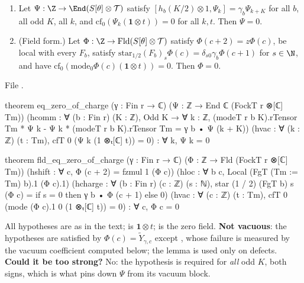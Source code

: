 \begin{theorem}\label{ch08:thm:unique}
\begin{enumerate}
\item Let $\Psi:\Z\to\End(\cheightS\otimes\cheightT)$ satisfy $[h_b(K/2)\otimes1,\Psi_k]=\gamma_b\Psi_{k+K}$
  for all $b$, all odd $K$, all $k$, and $\mathrm{cf}_0(\Psi_k(\mathbf 1\otimes t))=0$ for all $k,t$.
  Then $\Psi=0$.
\item (Field form.) Let $\Phi:\Z\to\mathrm{Fld}(\cheightS\otimes\cheightT)$ satisfy
  $\Phi(c+2)=z\Phi(c)$, be local with every $F_b$, satisfy
  $\mathrm{star}_{1/2}(F_b)_s\Phi(c)=\delta_{s0}\gamma_b\Phi(c+1)$ for $s\in\N$, and have
  $\mathrm{cf}_0(\mathrm{mode}_0\Phi(c)(\mathbf 1\otimes t))=0$.  Then $\Phi=0$.
\end{enumerate}
\end{theorem}
\noindent File .
\begin{leancode}
theorem eq_zero_of_charge (γ : Fin r → ℂ) (Ψ : ℤ → End ℂ (FockT r ⊗[ℂ] Tm))
    (hcomm : ∀ (b : Fin r) (K : ℤ), Odd K → ∀ k : ℤ,
      (modeT r b K).rTensor Tm * Ψ k - Ψ k * (modeT r b K).rTensor Tm = γ b • Ψ (k + K))
    (hvac : ∀ (k : ℤ) (t : Tm), cfT 0 (Ψ k (1 ⊗ₜ[ℂ] t)) = 0) : ∀ k, Ψ k = 0

theorem fld_eq_zero_of_charge (γ : Fin r → ℂ) (Φ : ℤ → Fld (FockT r ⊗[ℂ] Tm))
    (hshift : ∀ c, Φ (c + 2) = fzmul 1 (Φ c))
    (hloc : ∀ b c, Local (FgT (Tm := Tm) b).1 (Φ c).1)
    (hcharge : ∀ (b : Fin r) (c : ℤ) (s : ℕ),
      star (1 / 2) (FgT b) s (Φ c) = if s = 0 then γ b • Φ (c + 1) else 0)
    (hvac : ∀ (c : ℤ) (t : Tm), cfT 0 (mode (Φ c).1 0 (1 ⊗ₜ[ℂ] t)) = 0) : ∀ c, Φ c = 0
\end{leancode}
\begin{dictionary}
All hypotheses are as in the text;  is $\mathbf 1\otimes t$;  is
the zero field.  \textbf{Not vacuous}: the hypotheses are satisfied by
$\Phi(c)=\widetilde Y_{\gamma,c}$ except , whose failure is measured by the vacuum
coefficient computed below; the lemma is used only on defects.  \textbf{Could it be too strong?}
No: the hypothesis  is required for \emph{all} odd $K$, both signs, which is what
pins down $\Psi$ from its vacuum block.
\end{dictionary}

